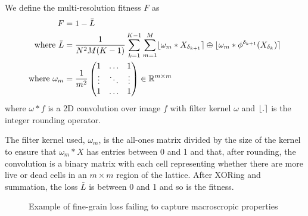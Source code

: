 \begin{definition}
We define the multi-resolution fitness $F$ as
\begin{align*}
    F &= 1 - \bar{L}\\
    \textnormal{where\ } \bar{L} &= \frac{1}{N^2M(K-1)} \sum_{k=1}^{K-1} \sum_{m=1}^{M} \lfloor\omega_m \ast X_{\delta_{k+1}}\rceil \oplus \lfloor\omega_m \ast \phi^{\delta_{k+1}}(X_{\delta_k})\rceil\\
    \textnormal{where\ } \omega_m &= \frac{1}{m^2}
    \begin{pmatrix}
        1 & \ldots & 1\\
        \vdots & \ddots & \vdots\\
        1 & \ldots & 1\\
    \end{pmatrix}
    \in \mathbb{R}^{m \times m}
\end{align*}
where $\omega \ast f$ is a 2D convolution over image $f$ with filter kernel $\omega$ and $\lfloor.\rceil$ is the integer rounding operator.
\end{definition}

The filter kernel used, $\omega_m$, is the all-ones matrix divided by the size of the kernel to ensure that $\omega_m \ast X$ has entries between 0 and 1 and that, after rounding, the convolution is a binary matrix with each cell representing whether there are more live or dead cells in an $m \times m$ region of the lattice. After XORing and summation, the loss $\bar{L}$ is between 0 and 1 and so is the fitness.

\begin{figure}[!h]
\centering
            \hfill
            \hfill
            \hfill
            \hfill
            \hfill
            \caption{Example of fine-grain loss failing to capture macroscropic properties}
\label{fig:singleres-fail}
\end{figure}

